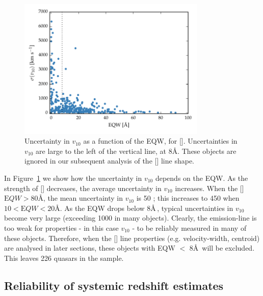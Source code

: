\begin{figure}
    \centering
    \includegraphics[width=0.8\textwidth]{figures/chapter04/eqw_cut.pdf} 
    \caption[{Uncertainty in $v_{10}$ as a function of the EQW, for [].}]{Uncertainty in $v_{10}$ as a function of the EQW, for []. Uncertainties in $v_{10}$ are large to the left of the vertical line, at 8\AA. These objects are ignored in our subsequent analysis of the [] line shape.}     
    \label{fig:eqw_cut}
\end{figure}

In Figure~\ref{fig:eqw_cut} we show how the uncertainty in $v_{10}$ depends on the EQW. 
As the strength of [] decreases, the average uncertainty in $v_{10}$ increases.
When the [] ${\mathrm EQW} > 80$\AA, the mean uncertainty in $v_{10}$ is 50 \kms; this increases to 450 \kms when $10 < {\mathrm EQW} < 20$\AA. 
As the EQW drops below 8\AA\,, typical uncertainties in $v_{10}$ become very large (exceeding 1000 \kms in many objects). 
Clearly, the emission-line is too weak for properties - in this case $v_{10}$ - to be reliably measured in many of these objects. 
Therefore, when the [] line properties (e.g. velocity-width, centroid) are analysed in later sections, these objects with EQW $<$ 8\AA\, will be excluded. 
This leaves 226 quasars in the sample. 

\subsection{Reliability of systemic redshift estimates}
\label{sec:ch4_redshifts}

